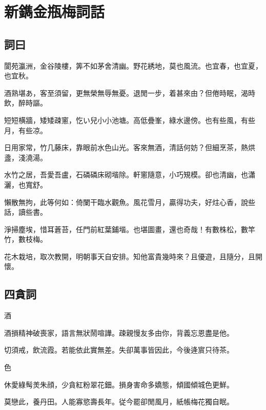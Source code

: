 \chapter*{新鐫金瓶梅詞話}


\section*{詞曰}

\begin{myquote0}
閬苑瀛洲，金谷陵樓，筭不如茅舍清幽。野花綉地，莫也風流。也宜春，也宜夏，也宜秋。

酒熟堪あ，客至須留，更無榮無辱無憂。退閒一步，着甚來由？但倦時眠，渴時飲，醉時謳。

短短横牆，矮矮疎窻，忔い兒小小池塘。高低疊峯，綠水邊傍。也有些風，有些月，有些凉。

日用家常，竹几藤床，靠眼前水色山光。客來無酒，清話何妨？但細烹茶，熱烘盞，淺澆湯。

水竹之居，吾愛吾盧，石磷磷床砌堦除。軒窻隨意，小巧䂓模。卻也清幽，也瀟灑，也寬舒。

懶散無拘，此等何如：倚闌干臨水觀魚。風花雪月，贏得功夫，好炷心香，說些話，讀些書。

淨掃塵埃，惜耳蒼苔，任門前紅葉鋪堦。也堪圖畫，還也奇哉！有數株松，數竿竹，數枝梅。

花木栽培，取次教開，明朝事天自安排。知他富貴幾時來？且優遊，且隨分，且開懷。
\end{myquote0}

\newpage\section*{四貪詞}

\hspace*{1em}酒

\begin{myquote0}
酒損精神破喪家，語言無狀鬧喧譁。疎親慢友多由你，背義忘恩盡是他。

切須戒，飲流霞。若能依此實無差。失卻萬事皆因此，今後逄賔只待茶。
\end{myquote0}

\hspace*{1em}色

\begin{myquote0}
休愛綠髩羙朱顔，少貪紅粉翠花鈿。損身害命多嬌態，傾國傾城色更鮮。

莫戀此，養丹田。人能寡慾壽長年。従今罷卻閒風月，紙帳梅花獨自眠。
\end{myquote0}

